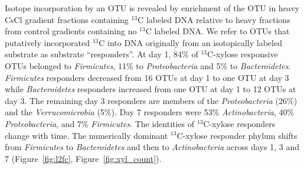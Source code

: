 Isotope incorporation by an OTU is revealed by enrichment of the OTU in heavy
CsCl gradient fractions containing $^{13}$C labeled DNA relative to heavy
fractions from control gradients containing no $^{13}$C labeled DNA. We refer
to OTUs that putatively incorporated $^{13}$C into DNA originally from an
isotopically labeled substrate as  substrate ``responders''. At day 1, 84\% of
$^{13}$C-xylose responsive OTUs belonged to \textit{Firmicutes}, 11\% to
\textit{Proteobacteria} and 5\% to \textit{Bacteroidetes}. \textit{Firmicutes}
responders decreased from 16 OTUs at day 1 to one OTU at day 3 while
\textit{Bacteroidetes} responders increased from one OTU at day 1 to 12 OTUs at
day 3. The remaining day 3 responders are members of the
\textit{Proteobacteria} (26\%) and the \textit{Verrucomicrobia} (5\%). Day
7 responders were 53\% \textit{Actinobacteria}, 40\% \textit{Proteobacteria},
and 7\% \textit{Firmicutes}. The identities of $^{13}$C-xylose responders
change with time. The numerically dominant $^{13}$C-xylose responder phylum
shifts from \textit{Firmicutes} to \textit{Bacteroidetes} and then to
\textit{Actinobacteria} across days 1, 3 and 7 (Figure~\ref{fig:l2fc},
Figure~\ref{fig:xyl_count}). 

